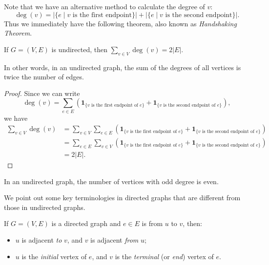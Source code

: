 Note that we have an alternative method to calculate the degree of $v$: 
\[\deg(v)=|\{e\mid v\text{ is the first endpoint}\}|+|\{e\mid v\text{ is the second endpoint}\}|.\]
Thus we immediately have the following theorem, also known as \emph{Handshaking Theorem}. 

\begin{theorem}
    If $G=(V,E)$ is undirected, then $\displaystyle\sum_{v\in V}\deg(v)=2|E|$. 
\end{theorem}

In other words, in an undirected graph, the sum of the degrees of all vertices is twice the number of edges. 

\begin{proof}
    Since we can write 
    \[\deg(v)=\sum_{e\in E}\left( \mathbf{1}_{\{v\text{ is the first endpoint of }e\}} + \mathbf{1}_{\{v\text{ is the second endpoint of }e\}} \right),\] 
    we have 
    \begin{align*}
        \sum_{v\in V}\deg(v)&=\sum_{v\in V}\sum_{e\in E}\left( \mathbf{1}_{\{v\text{ is the first endpoint of }e\}} + \mathbf{1}_{\{v\text{ is the second endpoint of }e\}} \right)\\
        &=\sum_{e\in E}\sum_{v\in V}\left( \mathbf{1}_{\{v\text{ is the first endpoint of }e\}} + \mathbf{1}_{\{v\text{ is the second endpoint of }e\}} \right)\\
        &=2|E|.
    \end{align*}
\end{proof}

\begin{corollary}
    In an undirected graph, the number of vertices with odd degree is even.
\end{corollary}

We point out some key terminologies in directed graphs that are different from those in undirected graphs. 

\begin{definition}
    If $G=(V, E)$ is a directed graph and $e\in E$ is from $u$ to $v$, then:
    \begin{itemize}
        \item $u$ is adjacent \emph{to} $v$, and $v$ is adjacent \emph{from} $u$;
        \item $u$ is the \emph{initial} vertex of $e$, and $v$ is the \emph{terminal} (or \emph{end}) vertex of $e$.
    \end{itemize}
\end{definition}

